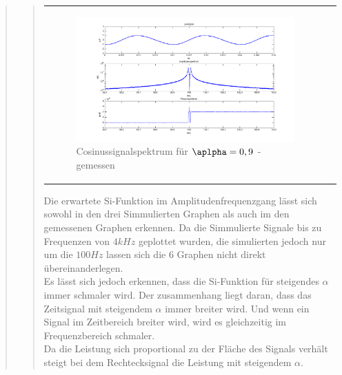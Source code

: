 \begin{quote}
\begin{quote}
\begin{center}
\begin{tabular}{ll}
\begin{minipage}{0.6\textwidth}
                    \begin{figure}[H]
                        \label{fig:}            
                        \includegraphics[scale=0.3]{./Bilder/cos_alpha9_-_gemessen.png} %
                        \caption{Cosinussignalspektrum für $\aplpha = 0,9$ - gemessen}
                    \end{figure}                
                
                \end{minipage}
                        
            \end{tabular}
            \end{center}
            
            Die erwartete Si-Funktion im Amplitudenfrequenzgang lässt sich sowohl in den drei Simmulierten Graphen als
            auch im den gemessenen Graphen erkennen. Da die Simmulierte Signale bis zu Frequenzen von $4 kHz$ geplottet
            wurden, die simulierten jedoch nur um die $100 Hz$ lassen sich die 6 Graphen nicht direkt
            übereinanderlegen.\\
            Es lässt sich jedoch erkennen, dass die Si-Funktion für steigendes $\alpha$ immer schmaler wird. Der
            zusammenhang liegt daran, dass das Zeitsignal mit steigendem $\alpha$ immer breiter wird. Und wenn ein
            Signal im Zeitbereich breiter wird, wird es gleichzeitig im Frequenzbereich schmaler.\\
            
            Da die Leistung sich proportional zu der Fläche des Signals verhält steigt bei dem Rechtecksignal die
            Leistung mit steigendem $\alpha$.
                     

\end{quote}
\end{quote}
